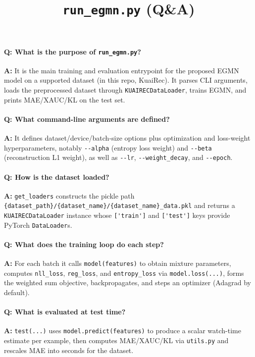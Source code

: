 \documentclass[11pt]{article}
\title{\texttt{run\_egmn.py} (Q\&A)}
\author{}
\date{}
\begin{document}
\maketitle

\paragraph{Q: What is the purpose of \texttt{run\_egmn.py}?}
\textbf{A:} It is the main training and evaluation entrypoint for the proposed EGMN model on a supported dataset (in this repo, KuaiRec). It parses CLI arguments, loads the preprocessed dataset through \lstinline|KUAIRECDataLoader|, trains EGMN, and prints MAE/XAUC/KL on the test set.

\paragraph{Q: What command-line arguments are defined?}
\textbf{A:} It defines dataset/device/batch-size options plus optimization and loss-weight hyperparameters, notably \lstinline|--alpha| (entropy loss weight) and \lstinline|--beta| (reconstruction L1 weight), as well as \lstinline|--lr|, \lstinline|--weight_decay|, and \lstinline|--epoch|.

\paragraph{Q: How is the dataset loaded?}
\textbf{A:} \lstinline|get_loaders| constructs the pickle path \lstinline|{dataset_path}/{dataset_name}/{dataset_name}_data.pkl| and returns a \lstinline|KUAIRECDataLoader| instance whose \lstinline|['train']| and \lstinline|['test']| keys provide PyTorch \lstinline|DataLoader|s.

\paragraph{Q: What does the training loop do each step?}
\textbf{A:} For each batch it calls \lstinline|model(features)| to obtain mixture parameters, computes \lstinline|nll_loss|, \lstinline|reg_loss|, and \lstinline|entropy_loss| via \lstinline|model.loss(...)|, forms the weighted sum objective, backpropagates, and steps an optimizer (Adagrad by default).

\paragraph{Q: What is evaluated at test time?}
\textbf{A:} \lstinline|test(...)| uses \lstinline|model.predict(features)| to produce a scalar watch-time estimate per example, then computes MAE/XAUC/KL via \lstinline|utils.py| and rescales MAE into seconds for the dataset.
\end{document}
